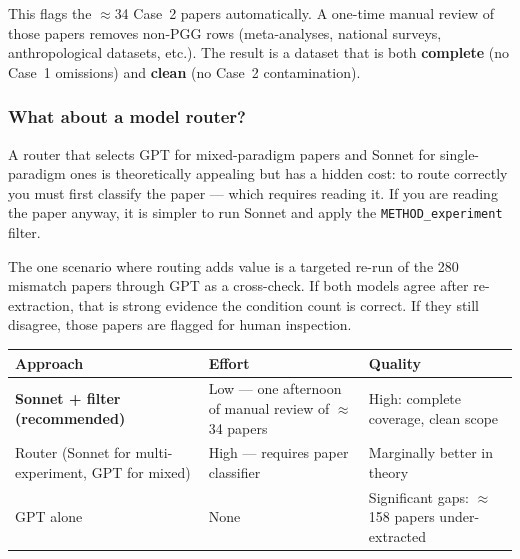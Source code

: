 \documentclass[11pt,a4paper]{article}
\begin{document}
        This flags the $\approx$34 Case~2 papers automatically.
        A one-time manual review of those papers removes non-PGG rows
        (meta-analyses, national surveys, anthropological datasets, etc.).
        The result is a dataset that is both \textbf{complete} (no Case~1 omissions)
        and \textbf{clean} (no Case~2 contamination).

        \subsubsection*{What about a model router?}

        A router that selects GPT for mixed-paradigm papers and Sonnet for
        single-paradigm ones is theoretically appealing but has a hidden cost:
        to route correctly you must first classify the paper --- which requires
        reading it.  If you are reading the paper anyway, it is simpler to run
        Sonnet and apply the \texttt{METHOD\_experiment} filter.

        The one scenario where routing adds value is a targeted re-run of the
        280 mismatch papers through GPT as a cross-check.  If both
        models agree after re-extraction, that is strong evidence the condition
        count is correct.  If they still disagree, those papers are flagged for
        human inspection.

        \begin{center}\small
        \begin{tabular}{lp{3.5cm}p{5cm}}
        \toprule
        \textbf{Approach} & \textbf{Effort} & \textbf{Quality} \\
        \midrule
        \textbf{Sonnet + filter (recommended)} &
          Low --- one afternoon of manual review of $\approx$34 papers &
          High: complete coverage, clean scope \\[3pt]
        Router (Sonnet for multi-experiment, GPT for mixed) &
          High --- requires paper classifier &
          Marginally better in theory \\[3pt]
        GPT alone &
          None &
          Significant gaps: $\approx$158 papers under-extracted \\
        \bottomrule
        \end{tabular}
        \end{center}
\end{document}

